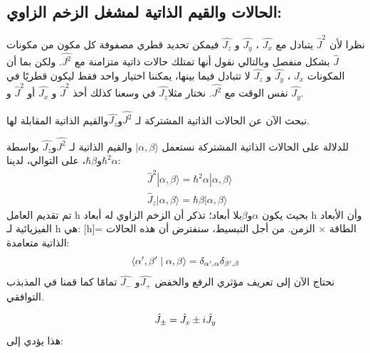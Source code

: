 \subsection*{الحالات والقيم الذاتية لمشغل الزخم الزاوي:}
نظرا لأن $\hat{J}^{2}$ يتبادل مع   $\hat{J_{x}}$ ، $\hat{J_{y}}$ و $\hat{J_{z}}$ 
فيمكن تحديد قطري مصفوفة كل مكون من مكونات $\hat{J}$ بشكل منفصل وبالتالي نقول أنها تمتلك حالات ذاتية متزامنة مع $\hat{J^{2}}$.  ولكن بما أن المكونات  $\hat{J_{x}}$ ، $\hat{J_{y}}$ و $\hat{J_{z}}$ 
لا تتبادل فيما بينها، يمكننا اختيار واحد فقط ليكون قطريًا في نفس الوقت مع $\hat{J^{2}}$. نختار مثلا$\hat{J_{z}}$ 
 في وسعنا كذلك أخذ $\hat{J}^{2}$ و $\hat{J_{x}}$ أو $\hat{J}^{2}$  و $\hat{J_{y}}$.
 
 
نبحث الآن عن الحالات الذاتية المشتركة لـ $\hat{J^{2}}$و$\hat{J_{z}}$والقيم الذاتية المقابلة لها.

 للدلالة على الحالات الذاتية المشتركة نستعمل 
$|\alpha, \beta\rangle  $
والقيم الذاتية لـ $\hat{J^{2}}$و$\hat{J_{z}}$ بواسطة  $\hbar^2 \alpha $و$\hbar \beta$، على التوالي، لدينا:
\begin{equation}
\begin{aligned}
	& \hat{J}^2|\alpha, \beta\rangle=\hbar^2 \alpha|\alpha, \beta\rangle \\
	& \hat{J}_{z}|\alpha, \beta\rangle=\hbar \beta|\alpha, \beta\rangle
\end{aligned}
\end{equation}
تم تقديم العامل h بحيث يكون $\alpha$و$\beta$بلا أبعاد؛ تذكر أن الزخم الزاوي له أبعاد h وأن الأبعاد الفيزيائية لـ h هي: [h]= الطاقة × الزمن. من أجل التبسيط، سنفترض أن هذه الحالات الذاتية متعامدة:
\begin{equation}
 \left\langle\alpha^{\prime}, \beta^{\prime} \mid \alpha, \beta\right\rangle=\delta_{\alpha^{\prime}, \alpha} \delta_{\beta^{\prime}, \beta}  \\
\end{equation}
نحتاج الآن إلى تعريف مؤثري الرفع والخفض $ \hat{J_{+}} $و $\hat{J_{-}}$ تمامًا كما قمنا في المذبذب التوافقي.

\begin{equation}
	 \hat{J}_{ \pm}=\hat{J}_x \pm i \hat{J}_y \\
\end{equation}
هذا يؤدي إلى:


